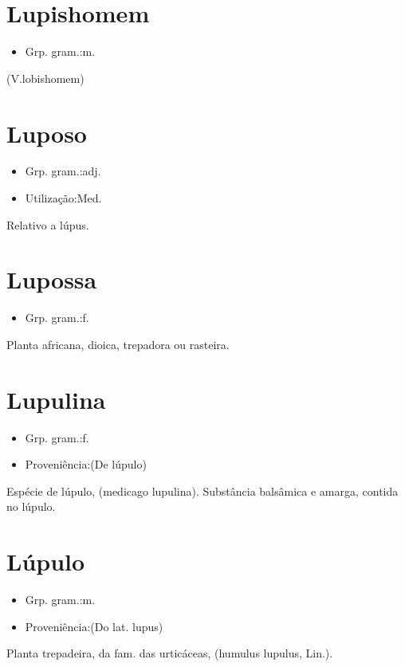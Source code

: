 \section{Lupishomem}
\begin{itemize}
\item {Grp. gram.:m.}
\end{itemize}
(V.lobishomem)
\section{Luposo}
\begin{itemize}
\item {Grp. gram.:adj.}
\end{itemize}
\begin{itemize}
\item {Utilização:Med.}
\end{itemize}
Relativo a lúpus.
\section{Lupossa}
\begin{itemize}
\item {Grp. gram.:f.}
\end{itemize}
Planta africana, dioica, trepadora ou rasteira.
\section{Lupulina}
\begin{itemize}
\item {Grp. gram.:f.}
\end{itemize}
\begin{itemize}
\item {Proveniência:(De \textunderscore lúpulo\textunderscore )}
\end{itemize}
Espécie de lúpulo, (\textunderscore medicago lupulina\textunderscore ).
Substância balsâmica e amarga, contida no lúpulo.
\section{Lúpulo}
\begin{itemize}
\item {Grp. gram.:m.}
\end{itemize}
\begin{itemize}
\item {Proveniência:(Do lat. \textunderscore lupus\textunderscore )}
\end{itemize}
Planta trepadeira, da fam. das urticáceas, (\textunderscore humulus lupulus\textunderscore , Lin.).
